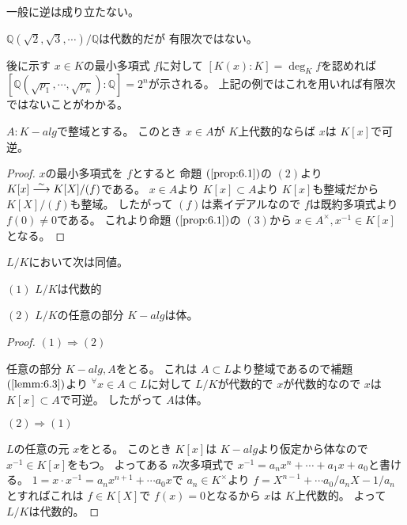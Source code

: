 \documentclass[../master_galois_theory]{subfiles}
\begin{document}
一般に逆は成り立たない。

\begin{exam}
  $\mathbb{Q}(\sqrt{2} , \sqrt{3} , \cdots) / \mathbb{Q}$は代数的だが
  有限次ではない。
\end{exam}

\begin{fact}
  後に示す $x \in K$の最小多項式 $f$に対して $[K(x):K] = \deg_K f$を認めれば
  $[\mathbb{Q}(\sqrt{p_1} , \cdots , \sqrt{p_n}):\mathbb{Q}] = 2^n$が示される。
  上記の例ではこれを用いれば有限次ではないことがわかる。
\end{fact}

\begin{lemm} \label{lemm:6.3}
  $A:K-alg$で整域とする。
  このとき
  $x \in A$が $K$上代数的ならば $x$は $K[x]$で可逆。
\end{lemm}

\begin{proof}
  $x$の最小多項式を $f$とすると
  命題 $(\mathrm{\ref{prop:6.1}})$の $(2)$より
  $K[x] \overset{\sim}{\longrightarrow} K[X]/(f)$である。
  $x \in A$より $K[x] \subset A$より $K[x]$も整域だから
  $K[X]/(f)$も整域。
  したがって $(f)$は素イデアルなので $f$は既約多項式より $f(0) \neq 0$である。
  これより命題 $(\mathrm{\ref{prop:6.1}})$の $(3)$から
  $x \in A^\times , x^{-1} \in K[x]$となる。
\end{proof}

\begin{prop} \label{prop:6.6}
  $L/K$において次は同値。

  $(1)$
  $L/K$は代数的

  $(2)$
  $L/K$の任意の部分 $K-alg$は体。
\end{prop}

\begin{proof}
  $(1) \Rightarrow (2)$

  任意の部分 $K-alg , A$をとる。
  これは $A \subset L$より整域であるので補題 $(\mathrm{\ref{lemm:6.3}})$より
  ${}^\forall x \in A \subset L$に対して $L/K$が代数的で
  $x$が代数的なので $x$は $K[x] \subset A$で可逆。
  したがって $A$は体。

  $(2) \Rightarrow (1)$

  $L$の任意の元 $x$をとる。
  このとき $K[x]$は $K-alg$より仮定から体なので $x^{-1} \in K[x]$をもつ。
  よってある $n$次多項式で $x^{-1} = a_n x^n + \cdots + a_1 x + a_0$と書ける。
  $1 = x \cdot x^{-1} = a_n x^{n+1} + \cdots a_0 x$で $a_n \in K^\times$より
  $f = X^{n-1} + \cdots a_0 / a_n X - 1 / a_n$とすればこれは
  $f \in K[X]$で $f(x) = 0$となるから $x$は $K$上代数的。
  よって $L/K$は代数的。
\end{proof}
\end{document}
